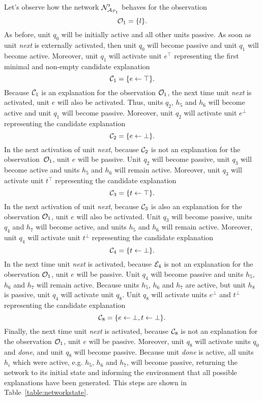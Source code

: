 Let's observe how the network $\mathcal{N}_{\mathcal{A}_{\mathcal{P}_1}}'$ behaves for the observation
\[
\mathcal{O}_1 = \{l\}.
\]
As before, unit $q_0$ will be initially active and all other units passive. As soon as unit \textit{next} is externally activated, then unit $q_0$ will become passive and unit $q_1$ will become active. Moreover, unit $q_1$ will activate unit $e^\top$ representing the first minimal and non-empty candidate explanation 
\[
\mathcal{C}_1 = \{ e \leftarrow \top\}.
\]
Because $\mathcal{C}_1$ is an explanation for the observation $\mathcal{O}_1$, the next time unit \textit{next} is activated, unit $e$ will also be activated. Thus, units $q_2$, $h_5$ and $h_6$ will become active and unit $q_1$ will become passive. Moreover, unit $q_2$ will activate unit $e^\bot$ representing the candidate explanation
\[
\mathcal{C}_2 = \{ e \leftarrow \bot\}.
\]
In the next activation of unit \textit{next}, because $\mathcal{C}_2$ is not an explanation for the observation~$\mathcal{O}_1$, unit $e$ will be passive. Unit $q_2$ will become passive, unit $q_3$ will become active and units $h_5$ and $h_6$ will remain active. Moreover, unit $q_3$ will activate unit $t^\top$ representing the candidate explanation
\[
\mathcal{C}_3 = \{ t \leftarrow \top\}.
\]
In the next activation of unit \textit{next}, because $\mathcal{C}_3$ is also an explanation for the observation $\mathcal{O}_1$, unit $e$ will also be activated. Unit $q_3$ will become passive, units $q_4$ and $h_7$ will become active, and units $h_5$ and $h_6$ will remain active. Moreover, unit $q_4$ will activate unit $t^\bot$ representing the candidate explanation
\[
\mathcal{C}_4 = \{ t \leftarrow \bot\}.
\]
In the next time unit \textit{next} is activated, because $\mathcal{E}_4$ is not an explanation for the observation $\mathcal{O}_1$, unit $e$ will be passive. Unit $q_4$ will become passive and units $h_5$, $h_6$ and $h_7$ will remain active. Because units $h_5$, $h_6$ and $h_7$ are active, but unit $h_8$ is passive, unit $q_4$ will activate unit $q_8$. Unit $q_8$ will activate units $e^\bot$ and $t^\bot$ representing the candidate explanation
\[
\mathcal{C}_8 = \{e \leftarrow \bot, t \leftarrow \bot\}.
\]
Finally, the next time unit \textit{next} is activated, because $\mathcal{C}_8$ is not an explanation for the observation $\mathcal{O}_1$, unit $e$ will be passive. Moreover, unit $q_8$ will activate units $q_0$ and \textit{done}, and unit $q_8$ will become passive. Because unit \textit{done} is active, all units $h_i$ which were active, e.g. $h_5$, $h_6$ and $h_7$, will become passive, returning the network to its initial state and informing the environment that all possible explanations have been generated. This steps are shown in Table~\ref{table:networkstate}.

